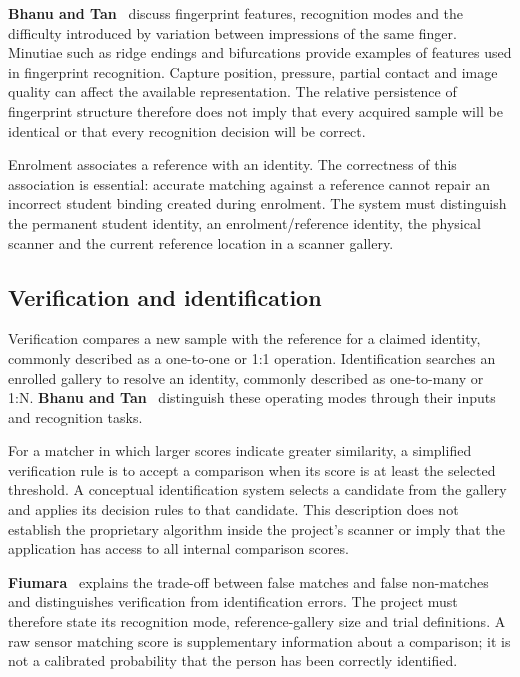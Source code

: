 \textbf{Bhanu and Tan}~\cite[pp. 7-11]{bhanu2004} discuss fingerprint features, recognition modes and the difficulty introduced by variation between impressions of the same finger. Minutiae such as ridge endings and bifurcations provide examples of features used in fingerprint recognition. Capture position, pressure, partial contact and image quality can affect the available representation. The relative persistence of fingerprint structure therefore does not imply that every acquired sample will be identical or that every recognition decision will be correct.

Enrolment associates a reference with an identity. The correctness of this association is essential: accurate matching against a reference cannot repair an incorrect student binding created during enrolment. The system must distinguish the permanent student identity, an enrolment/reference identity, the physical scanner and the current reference location in a scanner gallery.

\subsection{Verification and identification}\label{sec:2-5-2}

Verification compares a new sample with the reference for a claimed identity, commonly described as a one-to-one or 1:1 operation. Identification searches an enrolled gallery to resolve an identity, commonly described as one-to-many or 1:N. \textbf{Bhanu and Tan}~\cite{bhanu2004} distinguish these operating modes through their inputs and recognition tasks.

For a matcher in which larger scores indicate greater similarity, a simplified verification rule is to accept a comparison when its score is at least the selected threshold. A conceptual identification system selects a candidate from the gallery and applies its decision rules to that candidate. This description does not establish the proprietary algorithm inside the project's scanner or imply that the application has access to all internal comparison scores.

\textbf{Fiumara}~\cite{fiumara2022} explains the trade-off between false matches and false non-matches and distinguishes verification from identification errors. The project must therefore state its recognition mode, reference-gallery size and trial definitions. A raw sensor matching score is supplementary information about a comparison; it is not a calibrated probability that the person has been correctly identified.

